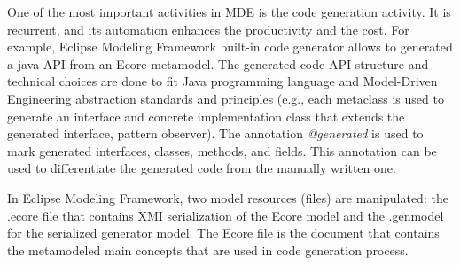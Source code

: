 One of the most important activities in MDE is the code generation activity. It is recurrent, and its automation enhances the productivity and the cost. For example, Eclipse Modeling Framework built-in code generator allows to generated a java API from an Ecore metamodel. The generated code API structure and technical choices are done to fit Java programming language and Model-Driven Engineering abstraction standards and principles (e.g., each metaclass is used to generate an interface and concrete implementation class that extends the generated interface, pattern observer).
 The annotation \textit{@generated} is used to mark generated interfaces, classes, methods, and fields. This annotation can be used to differentiate the generated code from the manually written one.

In Eclipse Modeling Framework, two model resources (files) are manipulated: the .ecore file that contains  XMI serialization of the Ecore model and the .genmodel for the serialized generator model. The Ecore file is the document that contains the metamodeled main concepts that are used in code generation process.


